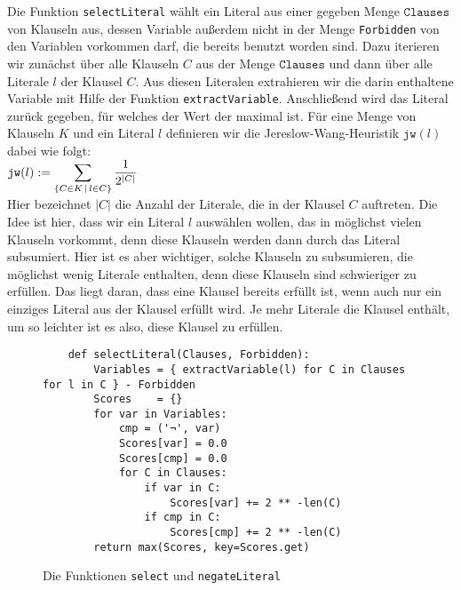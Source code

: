Die Funktion \texttt{selectLiteral} wählt ein Literal aus 
einer gegeben Menge $\texttt{Clauses}$ von Klauseln aus, dessen Variable außerdem nicht in der Menge
\texttt{Forbidden} von den Variablen vorkommen darf, die bereits benutzt worden sind.
Dazu iterieren wir zunächst über alle Klauseln $C$ aus der Menge $\texttt{Clauses}$ und dann über alle Literale $l$
der Klausel $C$.  Aus diesen Literalen extrahieren wir die darin enthaltene Variable mit Hilfe der Funktion
\texttt{extractVariable}.  Anschließend wird das Literal zurück gegeben, für welches der Wert der
  \cite{jereslow:1990} maximal ist.  Für eine Menge von Klauseln $K$ und ein
Literal $l$ definieren wir die Jereslow-Wang-Heuristik $\texttt{jw}(l)$ dabei wie folgt:
\\[0.2cm]
\hspace*{1.3cm}
$\displaystyle\mathtt{jw}(l) := \sum\limits_{\{C \in K \,\mid\, l \in C\}} \frac{1}{2^{|C|}}$
\\[0.2cm]
Hier bezeichnet $|C|$ die Anzahl der Literale, die in der Klausel $C$ auftreten.  Die Idee ist hier, dass wir
ein Literal $l$ auswählen wollen, das in möglichst vielen Klauseln vorkommt, denn diese Klauseln werden dann
durch das Literal subsumiert.  Hier ist es aber wichtiger, solche Klauseln zu subsumieren, die möglichst wenig
Literale enthalten, denn diese Klauseln sind schwieriger zu erfüllen.  Das liegt daran, dass eine Klausel
bereits erfüllt ist, wenn auch nur ein einziges Literal aus der Klausel erfüllt wird.  Je mehr Literale die
Klausel enthält, um so leichter ist es also, diese Klausel zu erfüllen.


\begin{figure}[!ht]
  \centering
\begin{verbatim}
    def selectLiteral(Clauses, Forbidden):
        Variables = { extractVariable(l) for C in Clauses for l in C } - Forbidden
        Scores    = {} 
        for var in Variables:
            cmp = ('¬', var)
            Scores[var] = 0.0
            Scores[cmp] = 0.0
            for C in Clauses:
                if var in C:
                    Scores[var] += 2 ** -len(C)
                if cmp in C: 
                    Scores[cmp] += 2 ** -len(C)
        return max(Scores, key=Scores.get)
\end{verbatim}
\vspace*{-0.3cm}
  \caption{Die Funktionen \texttt{select} und \texttt{negateLiteral}}
  \label{fig:solve-aux}
\end{figure}

